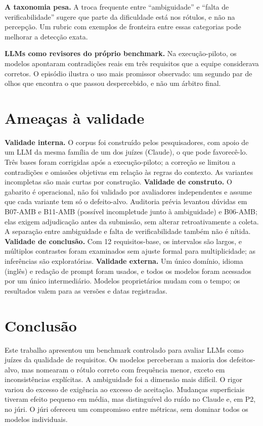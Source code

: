 \documentclass[12pt]{article}
\begin{document}
\textbf{A taxonomia pesa.} A troca frequente entre ``ambiguidade'' e ``falta de verificabilidade'' sugere que parte da dificuldade está nos rótulos, e não na percepção. Um rubric com exemplos de fronteira entre essas categorias pode melhorar a detecção exata.

\textbf{LLMs como revisores do próprio benchmark.} Na execução-piloto, os modelos apontaram contradições reais em três requisitos que a equipe considerava corretos. O episódio ilustra o uso mais promissor observado: um segundo par de olhos que encontra o que passou despercebido, e não um árbitro final.

\section{Ameaças à validade}

\textbf{Validade interna.} O corpus foi construído pelos pesquisadores, com apoio de um LLM da mesma família de um dos juízes (Claude), o que pode favorecê-lo. Três bases foram corrigidas após a execução-piloto; a correção se limitou a contradições e omissões objetivas em relação às regras do contexto. As variantes incompletas são mais curtas por construção.
\textbf{Validade de construto.} O gabarito é operacional, não foi validado por avaliadores independentes e assume que cada variante tem só o defeito-alvo. Auditoria prévia levantou dúvidas em B07-AMB e B11-AMB (possível incompletude junto à ambiguidade) e B06-AMB; elas exigem adjudicação antes da submissão, sem alterar retroativamente a coleta. A separação entre ambiguidade e falta de verificabilidade também não é nítida.
\textbf{Validade de conclusão.} Com 12 requisitos-base, os intervalos são largos, e múltiplos contrastes foram examinados sem ajuste formal para multiplicidade; as inferências são exploratórias.
\textbf{Validade externa.} Um único domínio, idioma (inglês) e redação de prompt foram usados, e todos os modelos foram acessados por um único intermediário. Modelos proprietários mudam com o tempo; os resultados valem para as versões e datas registradas.

\section{Conclusão}

Este trabalho apresentou um benchmark controlado para avaliar LLMs como juízes da qualidade de requisitos. Os modelos perceberam a maioria dos defeitos-alvo, mas nomearam o rótulo correto com frequência menor, exceto em inconsistências explícitas. A ambiguidade foi a dimensão mais difícil. O rigor variou do excesso de exigência ao excesso de aceitação. Mudanças superficiais tiveram efeito pequeno em média, mas distinguível do ruído no Claude e, em P2, no júri. O júri ofereceu um compromisso entre métricas, sem dominar todos os modelos individuais.
\end{document}
